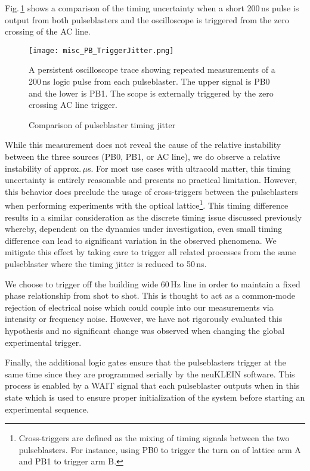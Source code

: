 Fig.\,\ref{fig:pbTimingJitter} shows a comparison of the timing uncertainty when a short 200\,ns pulse is output from both pulseblasters and the oscilloscope is triggered from the zero crossing of the AC line.
	\begin{figure}
		\centerline{
		\texttt{[image: misc\_PB\_TriggerJitter.png]}}
		\caption{Comparison of pulseblaster timing jitter}{A persistent oscilloscope trace showing repeated measurements of a 200\,ns logic pulse from each pulseblaster. The upper signal is PB0 and the lower is PB1. The scope is externally triggered by the zero crossing AC line trigger.}
		\label{fig:pbTimingJitter}
	\end{figure} 
While this measurement does not reveal the cause of the relative instability between the three sources (PB0, PB1, or AC line), we do observe a relative instability of approx.\,$\mu$s.
For most use cases with ultracold matter, this timing uncertainty is entirely reasonable and presents no practical limitation.
However, this behavior does preclude the usage of cross-triggers between the pulseblasters when performing experiments with the optical lattice\footnote{Cross-triggers are defined as the mixing of timing signals between the two pulseblasters.
For instance, using PB0 to trigger the turn on of lattice arm A and PB1 to trigger arm B.}.
This timing difference results in a similar consideration as the discrete timing issue discussed previously whereby, dependent on the dynamics under investigation, even small timing difference can lead to significant variation in the observed phenomena.
We mitigate this effect by taking care to trigger all related processes from the same pulseblaster where the timing jitter is reduced to 50\,ns.

We choose to trigger off the building wide 60\,Hz line in order to maintain a fixed phase relationship from shot to shot.
This is thought to act as a common-mode rejection of electrical noise which could couple into our measurements via intensity or frequency noise.
However, we have not rigorously evaluated this hypothesis and no significant change was observed when changing the global experimental trigger.

Finally, the additional logic gates ensure that the pulseblasters trigger at the same time since they are programmed serially by the neuKLEIN software.
This process is enabled by a WAIT signal that each pulseblaster outputs when in this state which is used to ensure proper initialization of the system before starting an experimental sequence.

